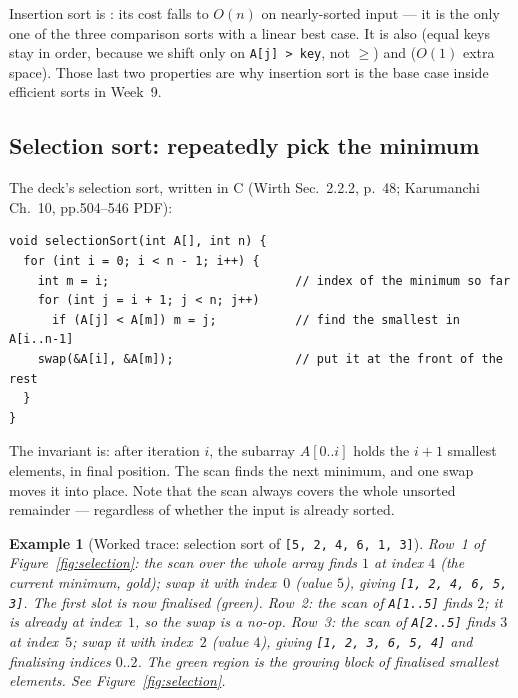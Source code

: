 \documentclass[11pt]{article}
\newtheorem{example}{Example}[section]
\begin{document}
Insertion sort is : its cost falls to $O(n)$ on nearly-sorted input --- it is the only one of the three comparison sorts with a linear best case. It is also  (equal keys stay in order, because we shift only on \texttt{A[j] > key}, not $\ge$) and  ($O(1)$ extra space). Those last two properties are why insertion sort is the base case inside efficient sorts in Week~9.

\subsection{Selection sort: repeatedly pick the minimum}

The deck's selection sort, written in C (Wirth Sec.~2.2.2, p.~48; Karumanchi Ch.~10, pp.504--546 PDF):

{\footnotesize
\begin{verbatim}
void selectionSort(int A[], int n) {
  for (int i = 0; i < n - 1; i++) {
    int m = i;                          // index of the minimum so far
    for (int j = i + 1; j < n; j++)
      if (A[j] < A[m]) m = j;           // find the smallest in A[i..n-1]
    swap(&A[i], &A[m]);                 // put it at the front of the rest
  }
}
\end{verbatim}
}

The invariant is: after iteration $i$, the subarray $A[0..i]$ holds the $i+1$ smallest elements, in final position. The scan finds the next minimum, and one swap moves it into place. Note that the scan always covers the whole unsorted remainder --- regardless of whether the input is already sorted.

\begin{example}[Worked trace: selection sort of \texttt{[5, 2, 4, 6, 1, 3]}]
Row~1 of Figure~\ref{fig:selection}: the scan over the whole array finds $1$ at index $4$ (the current minimum, gold); swap it with index~$0$ (value $5$), giving \texttt{[1, 2, 4, 6, 5, 3]}. The first slot is now finalised (green). Row~2: the scan of \texttt{A[1..5]} finds $2$; it is already at index~$1$, so the swap is a no-op. Row~3: the scan of \texttt{A[2..5]} finds $3$ at index~$5$; swap it with index~$2$ (value $4$), giving \texttt{[1, 2, 3, 6, 5, 4]} and finalising indices $0..2$. The green region is the growing block of finalised smallest elements. See Figure~\ref{fig:selection}.
\end{example}
\end{document}

